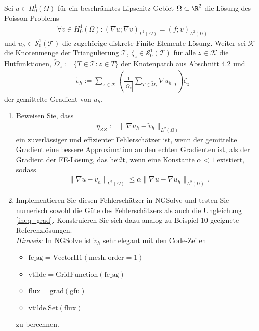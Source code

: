 
\begin{exercise}

Sei $u \in H_0^1(\Omega)$ für ein beschränktes Lipschitz-Gebiet $\Omega \subset \R^2$
die Lösung des Poisson-Problems
\begin{align}
  \forall v \in H_0^1(\Omega): (\nabla u;\nabla v)_{L^2(\Omega)} = (f;v)_{L^2(\Omega)}
\end{align}
und $u_h \in \mathcal{S}_0^1(\mathcal{T})$ die zugehörige diskrete Finite-Elemente Lösung.
Weiter sei $\mathcal{K}$ die Knotenmenge der Triangulierung $\mathcal{T}$,
$\zeta_z \in \mathcal{S}_0^1(\mathcal{T})$ für alle $z \in \mathcal{K}$ die Hutfunktionen,
$\tilde{\Omega}_z := \{T \in \mathcal{T}: z \in T\}$ der Knotenpatch aus Abschnitt 4.2 und
\begin{align}
  \tilde{v}_h := \sum_{z \in \mathcal{K}}\left(\frac{1}{|\tilde{\Omega}_z|}
  \sum_{T \in \tilde{\Omega}_z}\nabla u_h|_T\right)\zeta_z
\end{align}
der gemittelte Gradient von $u_h$.
\begin{enumerate}[label = \textbf{\alph*)}]
  \item Beweisen Sie, dass
  \begin{align}
    \eta_{ZZ} := \|\nabla u_h - \tilde{v}_h\|_{L^2(\Omega)}
  \end{align}
  ein zuverlässiger und effizienter Fehlerschätzer ist, wenn der gemittelte
  Gradient eine bessere Approximation an den echten Gradienten ist, als der
  Gradient der FE-Lösung, das heißt, wenn eine Konstante $\alpha < 1$ existiert,
  sodass
  \begin{align}
    \|\nabla u - \tilde{v}_h\|_{L^2(\Omega)} \leq \alpha\|\nabla u - \nabla u_h\|_{L^2(\Omega)}.
    \label{ineq_grad}
  \end{align}
  \item Implementieren Sie diesen Fehlerschätzer in NGSolve und testen Sie numerisch
  sowohl die Güte des Fehlerschätzers als auch die Ungleichung \eqref{ineq_grad}.
  Konstruieren Sie sich dazu analog zu Beispiel 10 geeignete Referenzlösungen. \\

  \textit{Hinweis:} In NGSolve ist $\tilde{v}_h$ sehr elegant mit den Code-Zeilen
  \begin{itemize}
    \item $\mathrm{fe\_ag = VectorH1(mesh, order = 1)}$
    \item $\mathrm{vtilde = GridFunction(fe\_ag)}$
    \item $\mathrm{flux = grad(gfu)}$
    \item $\mathrm{vtilde.Set(flux)}$
  \end{itemize}
  zu berechnen.
\end{enumerate}
\end{exercise}

